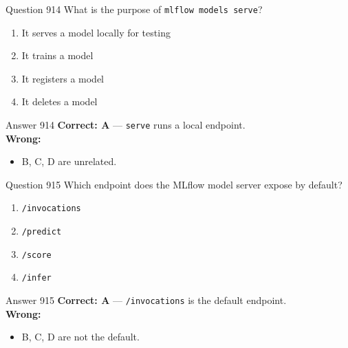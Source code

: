 \documentclass[aspectratio=169,11pt]{beamer}
\begin{document}
	\begin{frame}{Question 914}
		What is the purpose of \texttt{mlflow models serve}?
		\begin{enumerate}[label=\Alph*.]
			\item It serves a model locally for testing
			\item It trains a model
			\item It registers a model
			\item It deletes a model
		\end{enumerate}
	\end{frame}
	\begin{frame}{Answer 914}
		\textbf{Correct: A} --- \texttt{serve} runs a local endpoint.\\
		\vspace{0.5em}
		\textbf{Wrong:}
		\begin{itemize}
			\item B, C, D are unrelated.
		\end{itemize}
	\end{frame}
	
	\begin{frame}{Question 915}
		Which endpoint does the MLflow model server expose by default?
		\begin{enumerate}[label=\Alph*.]
			\item \texttt{/invocations}
			\item \texttt{/predict}
			\item \texttt{/score}
			\item \texttt{/infer}
		\end{enumerate}
	\end{frame}
	\begin{frame}{Answer 915}
		\textbf{Correct: A} --- \texttt{/invocations} is the default endpoint.\\
		\vspace{0.5em}
		\textbf{Wrong:}
		\begin{itemize}
			\item B, C, D are not the default.
		\end{itemize}
	\end{frame}
	
\end{document}
